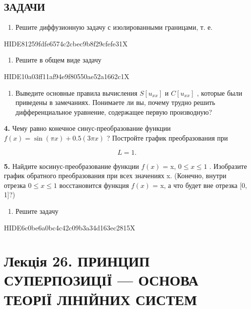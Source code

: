 \documentclass[
  ukrainian,
]{article}
\providecommand{\tightlist}{%
  \setlength{\itemsep}{0pt}\setlength{\parskip}{0pt}}
\begin{document}
\subsection{ЗАДАЧИ}\label{ux437ux430ux434ux430ux447ux438-1}

\begin{enumerate}
\def\labelenumi{\arabic{enumi}.}
\tightlist
\item
  Решите диффузионную задачу с изолированными границами, т. е.
\end{enumerate}

HIDE81259fdfe6574c2cbec9b8f29cfefe31X

\begin{enumerate}
\def\labelenumi{\arabic{enumi}.}
\setcounter{enumi}{1}
\tightlist
\item
  Решите в общем виде задачу
\end{enumerate}

HIDE10a03ff11af94e9f80550ae52a1662c1X

\begin{enumerate}
\def\labelenumi{\arabic{enumi}.}
\setcounter{enumi}{2}
\tightlist
\item
  Выведите основные правила вычисления \(S[u_{xx}]\) и \(C[u_{xx}]\) ,
  которые были приведены в замечаниях. Понимаете ли вы, почему трудно
  решить дифференциальное уравнение, содержащее первую производную?
\end{enumerate}

\textbf{4.} Чему равно конечное синус-преобразование функции
\(f(x) = \sin{(\pi x)} + 0.5 (3\pi x)\) ? Постройте график
преобразования при

\[
L=1.
\]

\textbf{5.} Найдите косинус-преобразование функции \(f(x)\) = x,
\(0 \le x \le 1\) . Изобразите график обратного преобразования при всех
значениях x. (Конечно, внутри отрезка \(0 \le x \le 1\) восстановится
функция \(f(x)\) = x, а что будет вне отрезка {[}0, 1{]}?)

\begin{enumerate}
\def\labelenumi{\arabic{enumi}.}
\setcounter{enumi}{5}
\tightlist
\item
  Решите задачу
\end{enumerate}

HIDE6c0be6a0bc4c42c09b3a34d163ec2815X

\section{Лекція 26. ПРИНЦИП СУПЕРПОЗИЦІЇ --- ОСНОВА ТЕОРІЇ ЛІНІЙНИХ
СИСТЕМ}\label{ux43bux435ux43aux446ux456ux44f-26.-ux43fux440ux438ux43dux446ux438ux43f-ux441ux443ux43fux435ux440ux43fux43eux437ux438ux446ux456ux457-ux43eux441ux43dux43eux432ux430-ux442ux435ux43eux440ux456ux457-ux43bux456ux43dux456ux439ux43dux438ux445-ux441ux438ux441ux442ux435ux43c}
\end{document}
